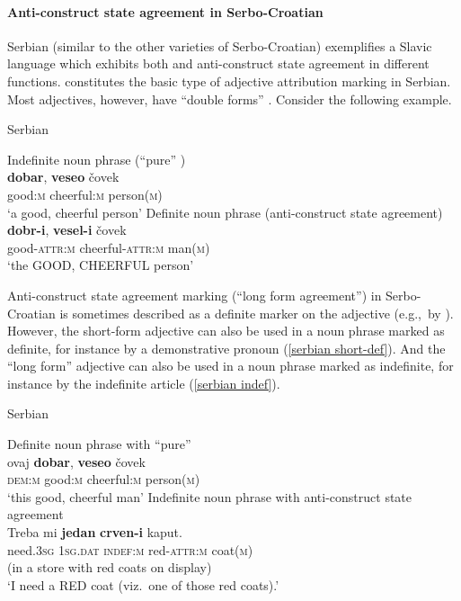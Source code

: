\paragraph*{Anti\hyp{}construct state agreement in Serbo-Croatian} \label{serbian synchr}
Serbian (similar to the other varieties of Serbo-Croatian) exemplifies a Slavic language which exhibits both  and anti\hyp{}construct state agreement in different functions.  constitutes the basic type of adjective attribution marking in Serbian. Most adjectives, however, have “double forms” \cite[179–180]{kramsky1972}. Consider the following example.
\begin{exe}
\ex \rm{Serbian \citep[59]{zlatic1997}}
\begin{xlist}
\ex \rm{Indefinite noun phrase (“pure” )}\\
\gll	\textbf{dobar}, \textbf{veseo} čovek\\
	good:\textsc{m} cheerful:\textsc{m} person(\textsc{m})\\
\glt	‘a good, cheerful person’
\ex \rm{Definite noun phrase (anti\hyp{}construct state agreement)}\\
\gll	\textbf{dobr-i}, \textbf{vesel-i} čovek\\
	good-\textsc{attr:m} cheerful-\textsc{attr:m} man(\textsc{m})\\
\glt	‘the GOOD, CHEERFUL person’
\end{xlist}
\end{exe}
Anti\hyp{}construct state agreement marking (“long form agreement”) in Serbo\hyp{}Croatian is sometimes described as a definite marker on the adjective (e.g.,~by \citealt[18–19]{kordic1997}). However, the short-form adjective can also be used in a noun phrase marked as definite, for instance by a demonstrative pronoun (\ref{serbian short-def}). And the “long form” adjective can also be used in a noun phrase marked as indefinite, for instance by the indefinite article (\ref{serbian indef}). 
\begin{exe}
\ex \rm{Serbian \citep{marusic-etal2007}}
\begin{xlist}
\label{serbian short-def} 
\ex \rm{Definite noun phrase with “pure” }\\
\gll	ovaj \textbf{dobar}, \textbf{veseo} \v{c}ovek\\
	\textsc{dem:m} good:\textsc{m} cheerful:\textsc{m} person(\textsc{m})\\
\glt	‘this good, cheerful man’
\label{serbian indef}
\ex \rm{Indefinite noun phrase with anti\hyp{}construct state agreement}\\
\gll	Treba mi \textbf{jedan} \textbf{crven-i} kaput.\\
	need.\textsc{3sg} \textsc{1sg.dat} \textsc{indef:m} red-\textsc{attr:m} coat(\textsc{m})\\
\glt (in a store with red coats on display)\\‘I need a RED coat (viz.~one of those red coats).’
\end{xlist}
\end{exe}
